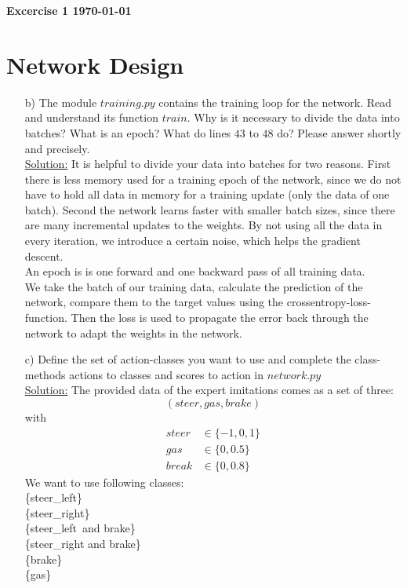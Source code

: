 \documentclass[DIN, pagenumber=false, fontsize=11pt, parskip=half]{scrartcl}
\newcommand{\mytitle}[1]{{\noindent\textbf{#1}}}
\newcommand{\sol}{\underline{Solution:} }
\begin{document}
\mytitle{{\huge Excercise 1} \hfill \today}
\section{Network Design }
\begin{enumerate}[b)]
	\item[b)]The module $training.py$ contains the training loop for the network. Read and understand its
	function $train$. Why is it necessary to divide the data into batches? What is an epoch? What do
	lines $43$ to $48$ do? Please answer shortly and precisely.\\
	\sol It is helpful to divide your data into batches for two reasons.
        First there is less memory used for a training epoch of the network, since we do not have to hold all data in memory for a
        training update (only the data of one batch).
        Second the network learns faster with smaller batch sizes, since there are many incremental updates to the
        weights. By not using all the data in every iteration, we introduce a certain noise, which helps the gradient
        descent.\\
	An epoch is is one forward and one backward pass of all training data.\\
	We take the batch of our training data, calculate the prediction of the network, compare them to the target values using the crossentropy-loss-function.
        Then the loss is used to propagate the error back through the network to adapt the weights in the network. 
	\item[c)] Define the set of action-classes you want to use and complete the class-methods actions to classes
	and scores to action in $network.py$\\
	\sol The provided data of the expert imitations comes as a set of three:
	\[(steer,gas,brake)\]
	with
	\begin{align*}
		steer&\in\{-1,0,1\}\\
		gas&\in \{0,0.5\}\\
		break&\in \{0,0.8\}
	\end{align*}
	We want to use following classes:\\ 
		\{steer\_left\}\\
		\{steer\_right\}\\
		\{steer\_left\ and brake\}\\
		\{steer\_right and brake\}\\		
		\{brake\}\\
		\{gas\}\\

\end{enumerate}
\end{document}

